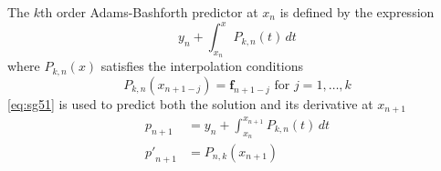The $k$th order Adams-Bashforth predictor at $x_n$ is defined by the expression 
\begin{equation}\label{eq:sg51}
  y_n + \int_{x_n}^{x} P_{k,n}(t) \,dt
\end{equation}
where $P_{k,n}(x)$ satisfies the interpolation conditions
\begin{equation}\label{eq:sg51b}
  P_{k,n}(x_{n+1-j}) = \bm{f}_{n+1-j} \text{ for } j=1,\dots ,k
\end{equation}
\autoref{eq:sg51} is used to predict both the solution and its derivative at 
$x_{n+1}$
\begin{equation}
  \begin{aligned}
    p_{n+1}    &= y_n + \int_{x_n}^{x_{n+1}}  P_{k,n} (t) \,dt \label{eq:sg52a}\\
    {p'}_{n+1} &= P_{n,k}(x_{n+1}) \label{eq:sg52b}
  \end{aligned}
\end{equation}

